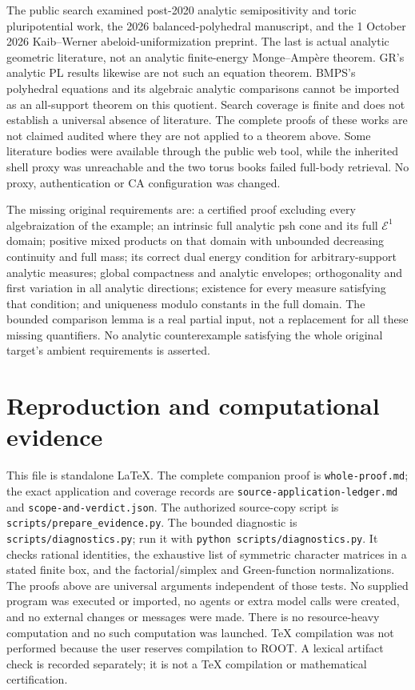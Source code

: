 \documentclass[11pt]{article}
\theoremstyle{definition}\newtheorem{definition}[theorem]{Definition}
\begin{document}
The public search examined post-2020 analytic semipositivity and toric
pluripotential work, the 2026 balanced-polyhedral manuscript, and the
1 October 2026 Kaib--Werner abeloid-uniformization preprint. The last is
actual analytic geometric literature, not an analytic finite-energy
Monge--Amp\`ere theorem. GR's analytic PL results likewise are not such an
equation theorem. BMPS's polyhedral equations and its algebraic analytic
comparisons cannot be imported as an all-support theorem on this quotient.
Search coverage is finite and does not establish a universal absence of
literature. The complete proofs of these works are not claimed audited
where they are not applied to a theorem above. Some literature bodies
were available through the public web tool, while the inherited shell
proxy was unreachable and the two torus books failed full-body retrieval.
No proxy, authentication or CA configuration was changed.

The missing original requirements are: a certified proof excluding every
algebraization of the example; an intrinsic full analytic psh cone and
its full $\mathcal E^1$ domain; positive mixed products on that domain
with unbounded decreasing continuity and full mass; its correct dual
energy condition for arbitrary-support analytic measures; global
compactness and analytic envelopes; orthogonality and first variation
in all analytic directions; existence for every measure satisfying that
condition; and uniqueness modulo constants in the full domain.
The bounded comparison lemma is a real partial input, not a replacement
for all these missing quantifiers. No analytic counterexample satisfying
the whole original target's ambient requirements is asserted.

\section{Reproduction and computational evidence}
This file is standalone LaTeX. The complete companion proof is
\texttt{whole-proof.md}; the exact application and coverage records are
\texttt{source-application-ledger.md} and \texttt{scope-and-verdict.json}.
The authorized source-copy script is \texttt{scripts/prepare\_evidence.py}.
The bounded diagnostic is \texttt{scripts/diagnostics.py}; run it with
\texttt{python scripts/diagnostics.py}. It checks rational identities,
the exhaustive list of symmetric character matrices in a stated finite
box, and the factorial/simplex and Green-function normalizations.
The proofs above are universal arguments independent of those tests.
No supplied program was executed or imported, no agents or extra model
calls were created, and no external changes or messages were made.
There is no resource-heavy computation and no such computation was
launched. TeX compilation was not performed because the user reserves
compilation to ROOT. A lexical artifact check is recorded separately;
it is not a TeX compilation or mathematical certification.
\end{document}
